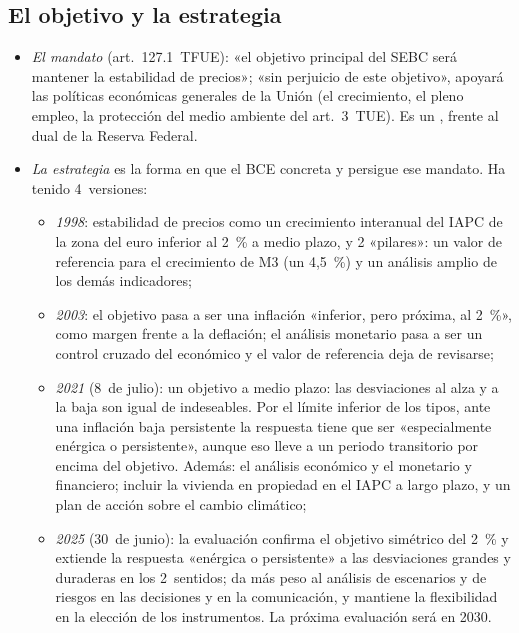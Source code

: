 \documentclass[11pt]{article}
\begin{document}
\subsection{El objetivo y la estrategia}\label{sec:estrategia}

\begin{itemize}
\item \emph{El mandato} (art.~127.1~TFUE): «el objetivo principal del SEBC será mantener la estabilidad de precios»; «sin perjuicio de este objetivo», apoyará las políticas económicas generales de la Unión (el crecimiento, el pleno empleo, la protección del medio ambiente del art.~3~TUE). Es un , frente al dual de la Reserva Federal.
\item \emph{La estrategia} es la forma en que el BCE concreta y persigue ese mandato. Ha tenido 4~versiones:
  \begin{itemize}
  \item \emph{1998}: estabilidad de precios como un crecimiento interanual del IAPC de la zona del euro inferior al 2~\% a medio plazo, y 2 «pilares»: un valor de referencia para el crecimiento de M3 (un 4,5~\%) y un análisis amplio de los demás indicadores;
  \item \emph{2003}: el objetivo pasa a ser una inflación «inferior, pero próxima, al 2~\%», como margen frente a la deflación; el análisis monetario pasa a ser un control cruzado del económico y el valor de referencia deja de revisarse;
  \item \emph{2021} (8~de julio)\nocite{BCE2021Estrategia}: un objetivo  a medio plazo: las desviaciones al alza y a la baja son igual de indeseables. Por el límite inferior de los tipos, ante una inflación baja persistente la respuesta tiene que ser «especialmente enérgica o persistente», aunque eso lleve a un periodo transitorio por encima del objetivo. Además: el análisis económico y el monetario y financiero; incluir la vivienda en propiedad en el IAPC a largo plazo, y un plan de acción sobre el cambio climático;
  \item \emph{2025} (30~de junio)\nocite{BCE2025Estrategia}: la evaluación confirma el objetivo simétrico del 2~\% y extiende la respuesta «enérgica o persistente» a las desviaciones grandes y duraderas en los 2~sentidos; da más peso al análisis de escenarios y de riesgos en las decisiones y en la comunicación, y mantiene la flexibilidad en la elección de los instrumentos. La próxima evaluación será en 2030.

\end{itemize}
\end{itemize}
\end{document}

